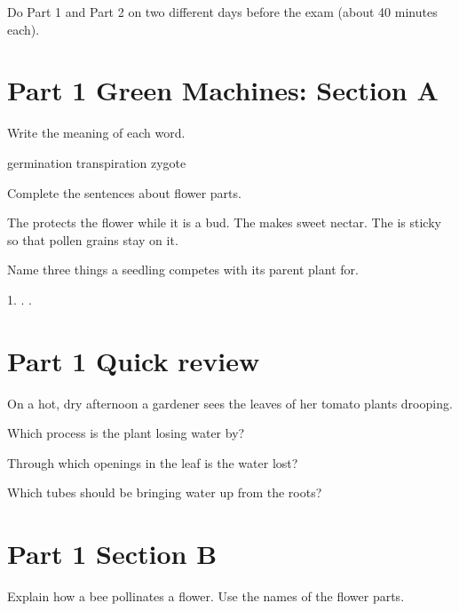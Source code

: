 \documentclass[11pt]{article}
\begin{document}
Do Part 1 and Part 2 on two different days before the exam (about 40 minutes each).


\section{Part 1 \textperiodcentered{} Green Machines: Section A}
\Q Write the meaning of each word.
\par{} germination
 transpiration
 zygote

\Q Complete the sentences about flower parts.
\par The  protects the flower while it is a bud. The  makes sweet nectar.
The  is sticky so that pollen grains stay on it.\par\vspace{2mm}

\Q Name three things a seedling competes with its parent plant for.
\par 1.  .  . \par\vspace{2mm}

\section{Part 1 \textperiodcentered{} Quick review}
\Q On a hot, dry afternoon a gardener sees the leaves of her tomato plants drooping.
\par{} Which process is the plant losing water by? \hfill{}
\par{} Through which openings in the leaf is the water lost? \hfill{}
\par{} Which tubes should be bringing water up from the roots? \hfill{}\par\vspace{1mm}

\section{Part 1 \textperiodcentered{} Section B}
\Q Explain how a bee pollinates a flower. Use the names of the flower parts.
\end{document}
